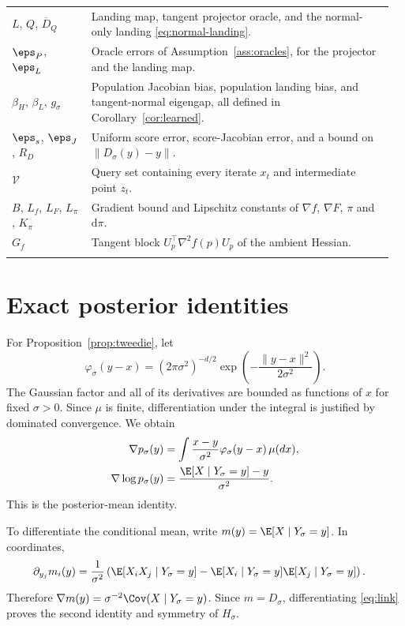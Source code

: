 \begin{longtable}{@{}p{0.20\linewidth}p{0.76\linewidth}@{}}
$L$, $Q$, $\overline D_Q$ & Landing map, tangent projector oracle, and the normal-only landing \eqref{eq:normal-landing}.\\\addlinespace[3pt]
$\eps_P$, $\eps_L$ & Oracle errors of Assumption~\ref{ass:oracles}, for the projector and the landing map.\\\addlinespace[3pt]
$\beta_H$, $\beta_L$, $g_\sigma$ & Population Jacobian bias, population landing bias, and tangent-normal eigengap, all defined in Corollary~\ref{cor:learned}.\\\addlinespace[3pt]
$\eps_s$, $\eps_J$, $R_D$ & Uniform score error, score-Jacobian error, and a bound on $\|D_\sigma(y)-y\|$.\\\addlinespace[3pt]
$\mathcal V$ & Query set containing every iterate $x_t$ and intermediate point $z_t$.\\\addlinespace[3pt]
$B$, $L_f$, $L_F$, $L_\pi$, $K_\pi$ & Gradient bound and Lipschitz constants of $\nabla f$, $\nabla F$, $\pi$ and $\mathrm d\pi$.\\\addlinespace[3pt]
$G_f$ & Tangent block $U_p^\top\nabla^2f(p)U_p$ of the ambient Hessian.\\\addlinespace[3pt]
\bottomrule
\end{longtable}

\section{Exact posterior identities}
\label{app:tweedie}

For Proposition~\ref{prop:tweedie}, let
\[
  \varphi_\sigma(y-x)
  =(2\pi\sigma^2)^{-d/2}
  \exp\!\left(-\frac{\|y-x\|^2}{2\sigma^2}\right).
\]
The Gaussian factor and all of its derivatives are bounded as functions of $x$ for fixed $\sigma>0$.  Since $\mu$ is finite, differentiation under the integral is justified by dominated convergence.  We obtain
\begin{align}
  \nabla p_\sigma(y)
  &=\int \frac{x-y}{\sigma^2}\varphi_\sigma(y-x)\,\mu(dx),\\
  \nabla\log p_\sigma(y)
  &=\frac{\E[X\mid Y_\sigma=y]-y}{\sigma^2}.
\end{align}
This is the posterior-mean identity.

To differentiate the conditional mean, write $m(y)=\E[X\mid Y_\sigma=y]$.  In coordinates,
\begin{align}
  \partial_{y_j}m_i(y)
  &=
  \frac{1}{\sigma^2}
  \left(
  \E[X_iX_j\mid Y_\sigma=y]
  -\E[X_i\mid Y_\sigma=y]\E[X_j\mid Y_\sigma=y]
  \right).
\end{align}
Therefore $\nabla m(y)=\sigma^{-2}\Cov(X\mid Y_\sigma=y)$.  Since $m=D_\sigma$, differentiating \eqref{eq:link} proves the second identity and symmetry of $H_\sigma$.

